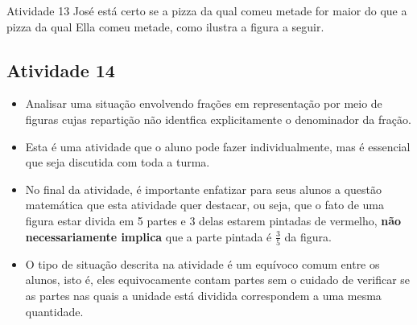 \begin{multicols}{2}
\begin{resposta*}{Atividade 13}
  José está certo se a pizza da qual comeu metade for maior do que a pizza da qual Ella comeu metade, como ilustra a figura a seguir.
  \begin{center}

  \end{center}

  \end{resposta*}



\subsection{Atividade 14}




  \vspace{.1cm}

  \begin{itemize} %
    \item       Analisar uma situação envolvendo frações em representação por meio de figuras cujas repartição não identfica explicitamente o denominador da fração.
\end{itemize} %


  \vspace{.1cm} 
  
  \vspace{.1cm}
  
\begin{itemize} %
    \item       Esta é uma atividade que o aluno pode fazer individualmente, mas é essencial que seja discutida com toda a turma.
    \item       No final da atividade, é importante enfatizar para seus alunos a questão matemática que esta atividade quer destacar, ou seja, que o fato de uma figura estar divida em 5 partes e 3 delas estarem pintadas de vermelho,       {\bf não necessariamente implica}       que a parte pintada é       $\frac{3}{5}$       da figura.
    \item       O tipo de situação descrita na atividade é um equívoco comum entre os alunos, isto é, eles equivocamente contam partes sem o cuidado de verificar se as partes nas quais a unidade está dividida correspondem a uma mesma quantidade.
\end{itemize} %



\end{multicols}
